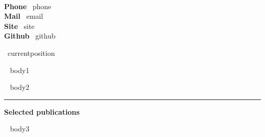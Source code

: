 \documentclass[a4paper]{article}
\newcommand{\block}[1]{\hrule \vspace{0.2cm} \textbf{\Large #1} \vspace{0.2cm}}
\newcommand{\skill}[2]{\textbf{#1} \hfill #2 \\}
\begin{document}
\begin{minipage}[t]{0.6\columnwidth}
    \\

\end{minipage} 
\hfill
\begin{minipage}[t]{0.375\columnwidth}
    \skill{Phone}{~{{phone}}~}
    \skill{Mail}{~{{email}}~}
    \skill{Site}{~{{site}}~}
    \skill{Github}{~{{github}}~}    
\end{minipage}
~{{currentposition}}~



\begin{minipage}[t]{0.6\columnwidth}
    ~{{ body1 }}~
\end{minipage} 
\hfill
\begin{minipage}[t]{0.375\columnwidth}
    ~{{ body2 }}~
\end{minipage}

\newpage
\block{Selected publications}
\nocite{*}
\printbibliography[heading=none]


~{{ body3 }}~
\end{document}
